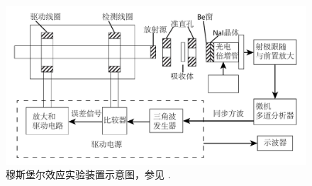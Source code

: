 \documentclass[aps,pre,12pt,preprint,%
	onecolumn,showpacs,showkeys,nofootinbib]{revtex4-1}
\begin{document}
	\begin{figure}[!ht]
	\centering
	\includegraphics[width=.8\linewidth]{img/device.png}
	\caption{穆斯堡尔效应实验装置示意图，参见 \cite{textbook}. }
	\end{figure}
\end{document}
